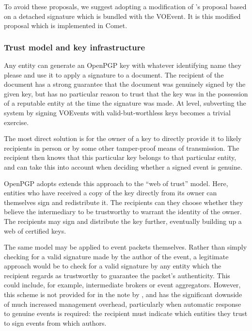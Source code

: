 \documentclass[5p,authoryear]{elsarticle}
\begin{document}
To avoid these proposals, we suggest adopting a modification of
\citeauthor{Denny:2008}'s proposal based on a detached signature
\citep[\S11.4]{Callas:2007} which is bundled with the VOEvent. It is this
modified proposal which is implemented in Comet.

\subsubsection{Trust model and key infrastructure}

Any entity can generate an OpenPGP key with whatever identifying name they
please and use it to apply a signature to a document. The recipient of the
document has a strong guarantee that the document was genuinely signed by the
given key, but has no particular reason to trust that the key was in the
possession of a reputable entity at the time the signature was made. At level,
subverting the system by signing VOEvents with valid-but-worthless keys
becomes a trivial exercise.

The most direct solution is for the owner of a key to directly provide it to
likely recipients in person or by some other tamper-proof means of
transmission. The recipient then knows that this particular key belongs to
that particular entity, and can take this into account when deciding whether a
signed event is genuine.

OpenPGP adopts extends this approach to the ``web of trust'' model. Here,
entities who have received a copy of the key directly from its owner can
themselves sign and redistribute it. The recipients can they choose whether
they believe the intermediary to be trustworthy to warrant the identity of the
owner. The recipients may sign and distribute the key further, eventually
building up a web of certified keys.

The same model may be applied to event packets themselves. Rather than simply
checking for a valid signature made by the author of the event, a legitimate
approach would be to check for a valid signature by any entity which the
recipient regards as trustworthy to guarantee the packet's authenticity. This
could include, for example, intermediate brokers or event aggregators.
However, this scheme is not provided for in the note by
\citeauthor{Denny:2008}, and has the significant downside of much increased
management overhead, particularly when automatic response to genuine events is
required: the recipient must indicate which entities they trust to sign events
from which authors.
\end{document}
